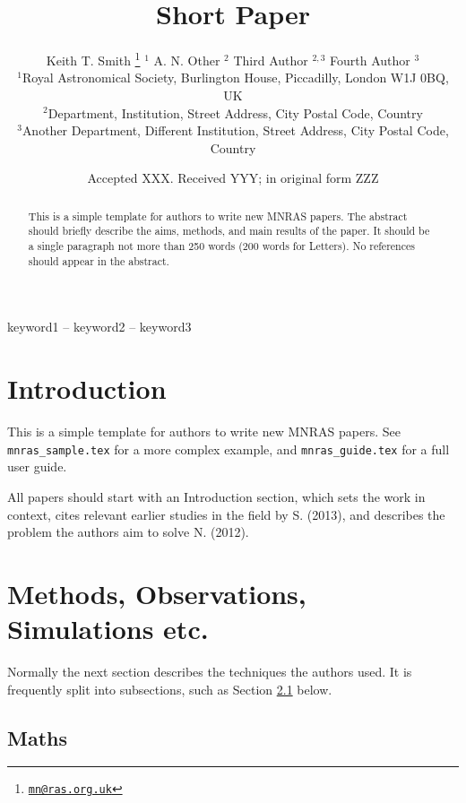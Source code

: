 \documentclass[a4paper,fleqn,usenatbib]{mnras}
\title[Short Paper]{Short Paper}
\author[K. T. Smith et al.]{
	Keith T. Smith
			\thanks{\href{mailto:mn@ras.org.uk}{\nolinkurl{mn@ras.org.uk}}}
				$^{1}$
		A. N. Other
				$^{2}$
		Third Author
				$^{2,3}$
		Fourth Author
				$^{3}$
	\\
			$^{1}$Royal Astronomical Society, Burlington House, Piccadilly, London W1J
0BQ, UK\\
			$^{2}$Department, Institution, Street Address, City Postal Code, Country\\
			$^{3}$Another Department, Different Institution, Street Address, City Postal
Code, Country}
\date{Accepted XXX. Received YYY; in original form ZZZ}
\begin{document}
\label{firstpage}
\pagerange{\pageref{firstpage}--\pageref{lastpage}}
\maketitle

\begin{abstract}
This is a simple template for authors to write new MNRAS papers. The
abstract should briefly describe the aims, methods, and main results of
the paper. It should be a single paragraph not more than 250 words (200
words for Letters). No references should appear in the abstract.
\end{abstract}

\begin{keywords}
keyword1 -- keyword2 -- keyword3
\end{keywords}



\hypertarget{introduction}{%
\section{Introduction}\label{introduction}}

This is a simple template for authors to write new MNRAS papers. See
\texttt{mnras\_sample.tex} for a more complex example, and
\texttt{mnras\_guide.tex} for a full user guide.

All papers should start with an Introduction section, which sets the
work in context, cites relevant earlier studies in the field by S.
(2013), and describes the problem the authors aim to solve N. (2012).

\hypertarget{methods-observations-simulations-etc.}{%
\section{Methods, Observations, Simulations
etc.}\label{methods-observations-simulations-etc.}}

Normally the next section describes the techniques the authors used. It
is frequently split into subsections, such as Section \ref{maths} below.

\hypertarget{maths}{%
\subsection{Maths}\label{maths}}
\end{document}

